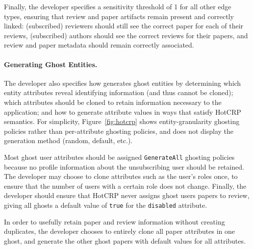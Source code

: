 Finally, the developer specifies a sensitivity threshold of 1 for all other edge types, ensuring that review
and paper artifacts remain present and correctly linked: (subscribed) reviewers should still see the
correct paper for each of their reviews, (subscribed) authors should see the correct reviews for
their papers, and review and paper metadata should remain correctly associated. 

\paragraph{Generating Ghost Entities.}
The developer also specifies how \sys generates ghost entities by determining which entity
attributes reveal identifying information (and thus cannot be cloned); which attributes should be
cloned to retain information necessary to the application; and how to generate attribute values in
ways that satisfy HotCRP semantics. 
For simplicity, Figure~\ref{fig:hotcrp} shows entity-granularity ghosting policies rather than
per-attribute ghosting policies, and does not display the generation method (\eg random, default,
etc.).

Most ghost user attributes should be assigned \texttt{GenerateAll} ghosting policies because no
profile information about the unsubscribing user should be retained. The developer may choose to
clone attributes such as the user's roles once, to ensure that the number of users with a certain
role does not change.
Finally, the developer should ensure that HotCRP never assigns ghost users papers to review, giving
all ghosts a default value of \texttt{true} for the \texttt{disabled} attribute. 

In order to usefully retain paper and review information without creating duplicates, the developer
chooses to entirely clone all paper attributes in one ghost, and generate the other ghost papers
with default values for all attributes. 


